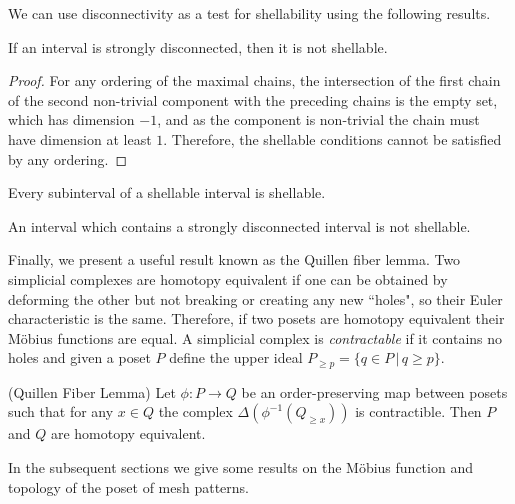 \documentclass[11pt,a4paper,oneside]{article}
\begin{document}
We can use disconnectivity as a test for shellability using the following results.

\begin{lem}\label{lem:strongdis}
If an interval is strongly disconnected, then it is not shellable.
\begin{proof}
For any ordering of the maximal chains, the intersection of the first chain of the second non-trivial 
component with the preceding chains is the empty set, which has dimension $-1$, and as the component is 
non-trivial the chain must have dimension at least $1$. Therefore, the shellable conditions cannot be 
satisfied by any ordering.
\end{proof}
\end{lem}

\begin{lem}\cite[Corollary 3.1.9]{Wac07}
Every subinterval of a shellable interval is shellable.
\end{lem}

\begin{cor}
An interval which contains a strongly disconnected interval is not shellable.
\end{cor}

Finally, we present a useful result known as the Quillen fiber lemma. Two simplicial
complexes are homotopy equivalent  if one can be obtained by deforming the other but
not breaking or creating any new ``holes", so their Euler
characteristic is the same. Therefore, if two posets are homotopy equivalent their
M\"obius functions are equal. A simplicial complex is \emph{contractable} if it contains
no holes and given a poset $P$ define the upper ideal $P_{\ge p}=\{q\in P\,|\,q\ge p\}$.
\begin{prop}\label{thm:Quil}(Quillen Fiber Lemma)
Let $\phi:P\rightarrow Q$ be an order-preserving map between posets such that for any
$x\in Q$ the complex $\Delta(\phi^{-1}(Q_{\ge x}))$ is contractible.
Then $P$ and $Q$ are homotopy equivalent.
\end{prop}

In the subsequent sections we give some results on the M\"obius function and topology of
the poset of mesh patterns.
\end{document}
